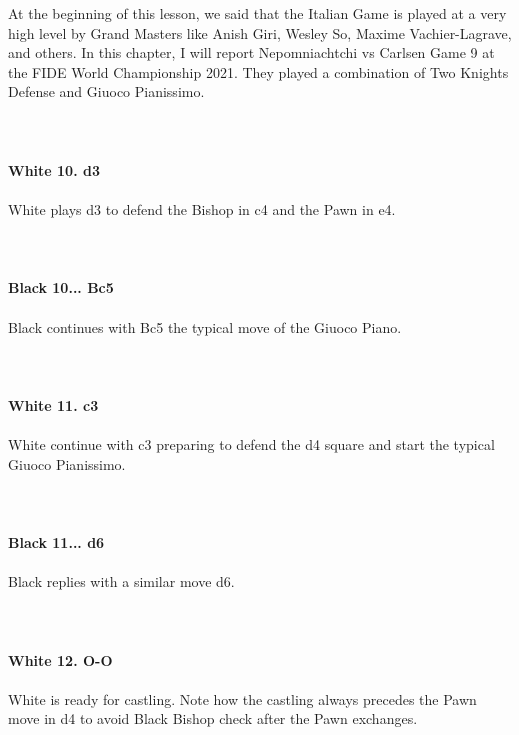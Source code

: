 \documentclass{article}
\begin{document}
At the beginning of this lesson, we said that the Italian Game is played at a very high level by Grand Masters like Anish Giri, Wesley So, Maxime Vachier-Lagrave, and others. In this chapter, I will report Nepomniachtchi vs Carlsen Game 9 at the FIDE World Championship 2021. They played a combination of Two Knights Defense and Giuoco Pianissimo.\\
\\

\\
\\
\textbf{White 10. d3}\\
\\
White plays d3 to defend the Bishop in c4 and the Pawn in e4.\\
\\

\\
\\
\textbf{Black 10... Bc5}\\
\\
Black continues with Bc5 the typical move of the Giuoco Piano.\\
\\

\\
\\
\textbf{White 11. c3}\\
\\
White continue with c3 preparing to defend the d4 square and start the typical Giuoco Pianissimo.\\
\\

\\
\\
\textbf{Black 11... d6}\\
\\
Black replies with a similar move d6.\\
\\

\\
\\
\textbf{White 12. O-O}\\
\\
White is ready for castling. Note how the castling always precedes the Pawn move in d4 to avoid Black Bishop check after the Pawn exchanges.\\
\\

\\
\end{document}
